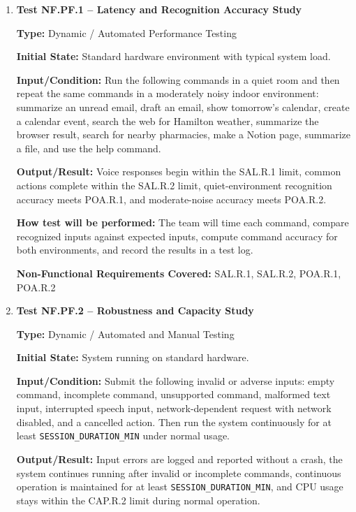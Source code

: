 \documentclass[12pt, titlepage]{article}
\begin{document}
\begin{enumerate}

\item \textbf{Test NF.PF.1 -- Latency and Recognition Accuracy Study}

\textbf{Type:} Dynamic / Automated Performance Testing

\textbf{Initial State:} Standard hardware environment with typical
system load.

\textbf{Input/Condition:} Run the following commands in a quiet room and
then repeat the same commands in a moderately noisy indoor environment:
summarize an unread email, draft an email, show tomorrow's calendar,
create a calendar event, search the web for Hamilton weather, summarize
the browser result, search for nearby pharmacies, make a Notion page,
summarize a file, and use the help command.

\textbf{Output/Result:} Voice responses begin within the SAL.R.1 limit,
common actions complete within the SAL.R.2 limit, quiet-environment
recognition accuracy meets POA.R.1, and moderate-noise accuracy meets
POA.R.2.

\textbf{How test will be performed:} The team will time each command,
compare recognized inputs against expected inputs, compute command
accuracy for both environments, and record the results in a test log.

\textbf{Non-Functional Requirements Covered:} SAL.R.1, SAL.R.2,
POA.R.1, POA.R.2

\item \textbf{Test NF.PF.2 -- Robustness and Capacity Study}

\textbf{Type:} Dynamic / Automated and Manual Testing

\textbf{Initial State:} System running on standard hardware.

\textbf{Input/Condition:} Submit the following invalid or adverse
inputs:
empty command, incomplete command, unsupported command, malformed text
input, interrupted speech input, network-dependent request with network
disabled, and a cancelled action. Then run the system continuously for
at least \texttt{SESSION\_DURATION\_MIN} under normal usage.

\textbf{Output/Result:} Input errors are logged and reported without a
crash, the system continues running after invalid or incomplete
commands, continuous operation is maintained for at least
\texttt{SESSION\_DURATION\_MIN}, and CPU usage stays within the CAP.R.2
limit during normal operation.


\end{enumerate}
\end{document}

